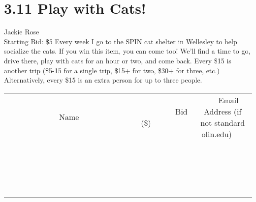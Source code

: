 \documentclass[11pt]{article}
\begin{document}
\section*{3.11 Play with Cats!}
Jackie Rose
\\
Starting Bid: \$5
\newline
Every week I go to the SPIN cat shelter in Wellesley to help socialize the cats. If you win this item, you can come too! We'll find a time to go, drive there, play with cats for an hour or two, and come back. Every \$15 is another trip (\$5-15 for a single trip, \$15+ for two, \$30+ for three, etc.) Alternatively, every \$15 is an extra person for up to three people.
\\[3ex]
\begin{tabular}{c c c}
~~~~~~~~~~~~~Name~~~~~~~~~~~~~ & ~~~~~~~~~Bid (\$)~~~~~~~~~  & ~~~Email Address (if not standard olin.edu)~~~\\
 & & \\
\hline
 & & \\
\hline
 & & \\
\hline
 & & \\
\hline
 & & \\
\hline
 & & \\
\hline
 & & \\
\hline
 & & \\
\hline
 & & \\
\hline
 & & \\
\hline
 & & \\
\hline
 & & \\
\hline
 & & \\
\hline
 & & \\
\hline
 & & \\
\hline
 & & \\
\hline
 & & \\
\hline
 & & \\
\hline
 & & \\
\hline
\end{tabular}
\newpage
\end{document}
